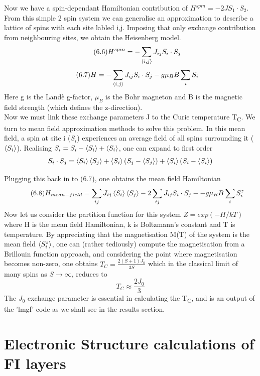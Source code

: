 \documentclass[12pt]{article}
\begin{document}
Now we have a spin-dependant Hamiltonian contribution of $H^{spin}=-2JS_1\cdot S_2$. From this simple 2 spin system we can generalise an approximation to describe a lattice of spins with each site labled i,j. Imposing that only exchange contribution from neighbouring sites, we obtain the Heisenberg model.
\begin{equation} \label{4.1} \tag{6.6}
H^{spin}=-\sum_{\expval{i,j}}J_{ij}S_i \cdot S_j
\end{equation}
\begin{equation} \label{4.1} \tag{6.7}
H=-\sum_{\expval{i,j}}J_{ij}S_i \cdot S_j-g\mu_BB\sum_iS_i
\end{equation}
Here g is the Landè g-factor, $\mu_B$ is the Bohr magneton and B is the magnetic field strength (which defines the z-direction). 
\\
Now we must link these exchange parameters J to the Curie temperature T\textsubscript{C}. We turn to mean field approximation methods to solve this problem. In this mean field, a spin at site i ($S_i$) experiences an average field of all spins surrounding it ($\expval{S_i}$). Realising $S_i=S_i-\expval{S_i}+\expval{S_i}$, one can expand to first order
$$S_i\cdot S_j=\expval{S_i}\expval{S_j}+\expval{S_i}(S_j-\expval{S_j}) + \expval{S_i}(S_i-\expval{S_i})$$

Plugging this back in to (6.7), one obtains the mean field Hamiltonian
\begin{equation} \label{4.1} \tag{6.8}
H_{mean-field}=\sum_{ij}J_{ij}\expval{S_i}\expval{S_j}-2\sum_{ij}J_{ij}S_i\cdot S_j--g\mu_BB\sum_iS^z_i
\end{equation}
Now let us consider the partition function for this system $Z=exp(-H/kT)$ where H is the mean field Hamiltonian, k is Boltzmann's constant and T is temperature. By appreciating that the magnetisation M(T) of the system is the mean field $\expval{S^z_i}$, one can (rather tediously) compute the magnetisation from a Brillouin function approach, and considering the point where magnetisation becomes non-zero, one obtains $T_C=\frac{2(S+1)J_0}{3S}$ which in the classical limit of many spins as $S\rightarrow \infty $, reduces to
\begin{equation} \label{4.1} \tag{6.9}
T_C\approx\frac{2J_0}{3}
\end{equation}
The $J_0$ exchange parameter is essential in calculating the T\textsubscript{C}, and is an output of the 'lmgf' code as we shall see in the results section.

\section{Electronic Structure calculations of FI layers}
\end{document}
